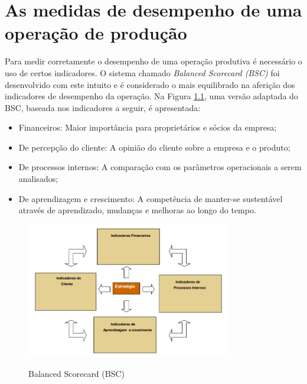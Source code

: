 \chapter{ As medidas de desempenho de uma operação de produção}
\label{chap:medida_desempenho_operacao_prod}

Para medir corretamente o desempenho de uma operação produtiva é necessário o uso de certos indicadores. O sistema chamado \textit{Balanced Scorecard (BSC)} foi desenvolvido com este intuito e é considerado o mais equilibrado na aferição dos indicadores de desempenho da operação.
Na Figura \ref{fig:balanced_scorecard}, uma versão adaptada do BSC, baseada nos indicadores a seguir, é apresentada:

\begin{itemize}
    \item Financeiros: Maior importância para proprietários e sócios da empresa;
    \item De percepção do cliente: A opinião do cliente sobre a empresa e o produto;
    \item De processos internos: A comparação com os parâmetros operacionais a serem analisados;
    \item De aprendizagem e crescimento: A competência de manter-se sustentável através de aprendizado, mudanças e melhoras ao longo do tempo.
\end{itemize}


\begin{figure}[H]
    \centering
    \caption{Balanced Scorecard (BSC)}
    \includegraphics[width =0.8\textwidth]{images/bsc.png}
    \label{fig:balanced_scorecard}
\end{figure}

